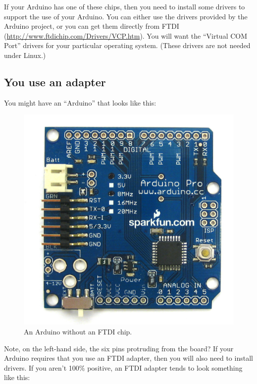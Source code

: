 If your Arduino has one of these chips, then you need to install some drivers to support the use of your Arduino. You can either use the drivers provided by the Arduino project, or you can get them directly from FTDI (\url{http://www.ftdichip.com/Drivers/VCP.htm}). You will want the ``Virtual COM Port'' drivers for your particular operating system. (These drivers are not needed under Linux.)

\subsection{You use an adapter}
You might have an ``Arduino'' that looks like this:

\begin{figure}[!ht]
  \begin{center}
    \includegraphics[width=0.8\linewidth]{ch0/images/20110115-arduino-pro-print}
    \caption{An Arduino without an FTDI chip.}
    \label{image:no-ftdi-arduino}
  \end{center}
\end{figure}

Note, on the left-hand side, the six pins protruding from the board? If your Arduino requires that you use an FTDI adapter, then you will also need to install drivers. If you aren't 100\% positive, an FTDI adapter tends to look something like this:

